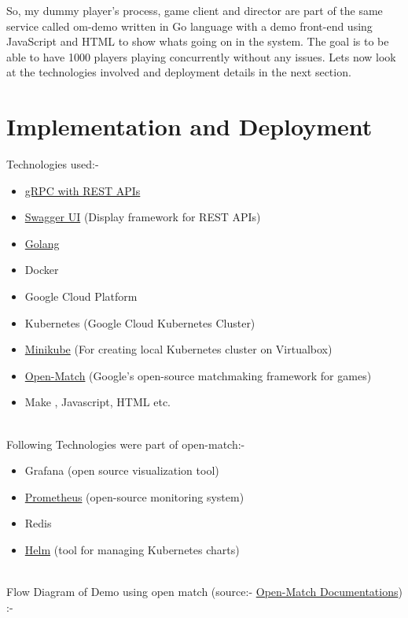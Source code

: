 \documentclass[12pt, letter]{article}
\begin{document}
So, my dummy player's process, game client and director are part of the same service called om-demo written in Go language with a demo front-end using JavaScript and HTML to show whats going on in the system. The goal is to be able to have 1000 players playing concurrently without any issues. Lets now look at the technologies involved and deployment details in the next section.



\section{Implementation    and    Deployment}

Technologies used:-
\begin{itemize}
  \item \href{https://grpc.io/blog/coreos/}{gRPC with REST APIs}
  \item \href{https://swagger.io/}{Swagger UI} (Display framework for REST APIs)
  \item \href{https://golang.org/}{Golang}
  \item Docker
  \item Google Cloud Platform 
  \item Kubernetes (Google Cloud Kubernetes Cluster)
  \item \href{https://github.com/kubernetes/minikube/}{Minikube} (For creating local Kubernetes cluster on Virtualbox)
  \item \href{https://open-match.dev/site/}{Open-Match} (Google's open-source matchmaking framework for games)
  \item Make , Javascript, HTML etc.
\end{itemize}
\\
Following Technologies were part of open-match:-
\begin{itemize}
  \item Grafana (open source visualization tool)
  \item \href{https://prometheus.io/}{Prometheus} (open-source monitoring system)
  \item Redis
  \item \href{https://github.com/helm/helm}{Helm} (tool for managing Kubernetes charts)
\end{itemize}

\\

Flow Diagram of Demo using open match (source:- \href{https://open-match.dev/site/docs/getting-started/first_match/}{Open-Match Documentations}) :-
\\
\end{document}
